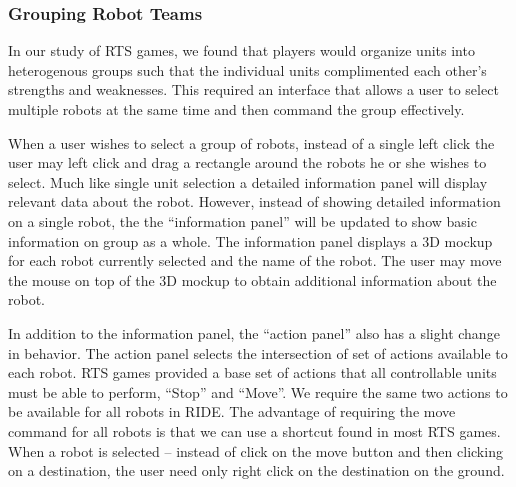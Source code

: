 \subsubsection{Grouping Robot Teams} %
\label{ssub:grouping_robot_teams}
In our study of RTS games, we found that players would organize units into heterogenous groups such that the individual units complimented each other's strengths and weaknesses. This required an interface that allows a user to select multiple robots at the same time and then command the group effectively.

When a user wishes to select a group of robots, instead of a single left click the user may left click and drag a rectangle around the robots he or she wishes to select. Much like single unit selection a detailed information panel will display relevant data about the robot. However, instead of showing detailed information on a single robot, the the ``information panel'' will be updated to show basic information on group as a whole. The information panel displays a 3D mockup for each robot currently selected and the name of the robot. The user may move the mouse on top of the 3D mockup to obtain additional information about the robot.

In addition to the information panel, the ``action panel'' also has a slight change in behavior. The action panel selects the intersection of set of actions available to each robot. RTS games provided a base set of actions that all controllable units must be able to perform, ``Stop'' and ``Move''. We require the same two actions to be available for all robots in RIDE. The advantage of requiring the move command for all robots is that we can use a shortcut found in most RTS games. When a robot is selected -- instead of click on the move button and then clicking on a destination, the user need only right click on the destination on the ground.


% 
% 
% 
% 

